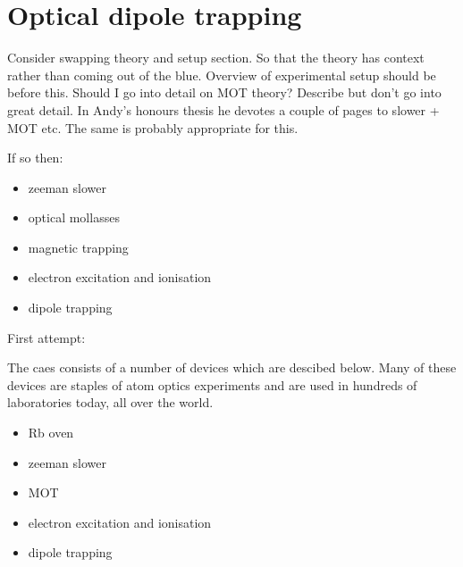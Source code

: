 \section{Optical dipole trapping}

Consider swapping theory and setup section. So that the theory has context rather than coming out of the blue.
Overview of experimental setup should be before this.
Should I go into detail on MOT theory?
Describe but don't go into great detail. In Andy's honours thesis he devotes a couple of pages to slower + MOT etc. The same is probably appropriate for this.

If so then:
\begin{itemize}
	\item zeeman slower
	\item optical mollasses
	\item magnetic trapping
	\item electron excitation and ionisation
	\item dipole trapping
\end{itemize}


First attempt:

The \gls{caes} consists of a number of devices which are descibed below. Many of these devices are staples of atom optics experiments and are used in hundreds of laboratories today, all over the world.

\begin{itemize}
	\item Rb oven
	\item zeeman slower
	\item MOT
	\item electron excitation and ionisation
	\item dipole trapping
\end{itemize}



